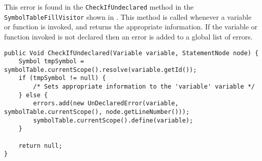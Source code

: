 This error is found in the \texttt{CheckIfUndeclared} method in the \texttt{SymbolTableFillVisitor} shown in .
This method is called whenever a variable or function is invoked, and returns the appropriate information. 
If the variable or function invoked is not declared then an error is added to a global list of errors. 
\begin{lstlisting}[caption=The CheckIfUndeclared method in the SymbolTableFillVisitor class in the \gls{gamble} compiler,numbers=none,frame=tlrb,label={lst:CheckIfUndeclared}]
public Void CheckIfUndeclared(Variable variable, StatementNode node) {
    Symbol tmpSymbol = symbolTable.currentScope().resolve(variable.getId());
    if (tmpSymbol != null) {
        /* Sets appropriate information to the 'variable' variable */
    } else {
        errors.add(new UnDeclaredError(variable, symbolTable.currentScope(), node.getLineNumber()));
        symbolTable.currentScope().define(variable);
    }

    return null;
}
\end{lstlisting}
